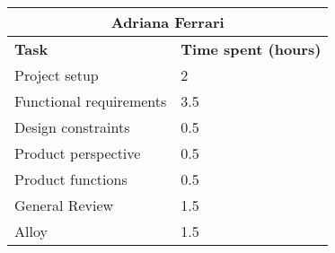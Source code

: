 \begin{table}[h]
  \center
  \begin{tabular}{l|l}
    \multicolumn{2}{c}{\textbf{Adriana Ferrari}} \\
    \hline
    \textbf{Task} & \textbf{Time spent (hours)}\\
    \hline
    Project setup & 2 \\
    Functional requirements & 3.5 \\
    Design constraints & 0.5 \\
    Product perspective & 0.5 \\
    Product functions & 0.5 \\
    General Review & 1.5 \\
    Alloy & 1.5 \\
  \end{tabular}
\end{table}